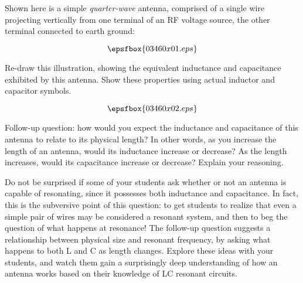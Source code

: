 

Shown here is a simple {\it quarter-wave} antenna, comprised of a single wire projecting vertically from one terminal of an RF voltage source, the other terminal connected to earth ground:

$$\epsfbox{03460x01.eps}$$

Re-draw this illustration, showing the equivalent inductance and capacitance exhibited by this antenna.  Show these properties using actual inductor and capacitor symbols.







$$\epsfbox{03460x02.eps}$$

\vskip 10pt

Follow-up question: how would you expect the inductance and capacitance of this antenna to relate to its physical length?  In other words, as you increase the length of an antenna, would its inductance increase or decrease?  As the length increases, would its capacitance increase or decrease?  Explain your reasoning.







Do not be surprised if some of your students ask whether or not an antenna is capable of resonating, since it possesses both inductance and capacitance.  In fact, this is the subversive point of this question: to get students to realize that even a simple pair of wires may be considered a resonant system, and then to beg the question of what happens at resonance!  The follow-up question suggests a relationship between physical size and resonant frequency, by asking what happens to both L and C as length changes.  Explore these ideas with your students, and watch them gain a surprisingly deep understanding of how an antenna works based on their knowledge of LC resonant circuits.




